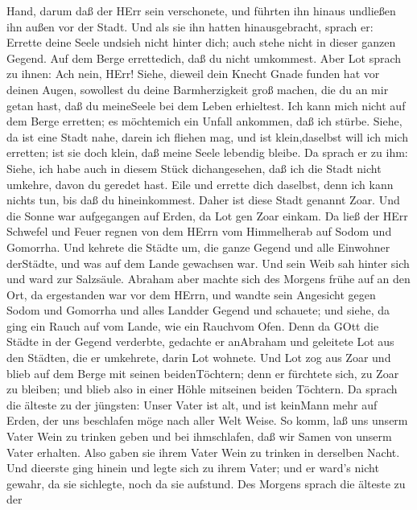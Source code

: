 Hand, darum daß der HErr sein verschonete, und führten ihn hinaus
undließen ihn außen vor der Stadt.  Und als sie ihn hatten
hinausgebracht, sprach er: Errette deine Seele undsieh nicht hinter
dich; auch stehe nicht in dieser ganzen Gegend. Auf dem Berge
errettedich, daß du nicht umkommest.  Aber Lot sprach zu
ihnen: Ach nein, HErr!  Siehe, dieweil dein Knecht Gnade
funden hat vor deinen Augen, sowollest du deine Barmherzigkeit groß
machen, die du an mir getan hast, daß du meineSeele bei dem Leben
erhieltest. Ich kann mich nicht auf dem Berge erretten; es möchtemich
ein Unfall ankommen, daß ich stürbe.  Siehe, da ist eine
Stadt nahe, darein ich fliehen mag, und ist klein,daselbst will ich mich
erretten; ist sie doch klein, daß meine Seele lebendig bleibe.
 Da sprach er zu ihm: Siehe, ich habe auch in diesem Stück
dichangesehen, daß ich die Stadt nicht umkehre, davon du geredet hast.
 Eile und errette dich daselbst, denn ich kann nichts tun,
bis daß du hineinkommest. Daher ist diese Stadt genannt Zoar.
 Und die Sonne war aufgegangen auf Erden, da Lot gen Zoar
einkam.  Da ließ der HErr Schwefel und Feuer regnen von dem
HErrn vom Himmelherab auf Sodom und Gomorrha.  Und kehrete
die Städte um, die ganze Gegend und alle Einwohner derStädte, und was
auf dem Lande gewachsen war.  Und sein Weib sah hinter sich
und ward zur Salzsäule.  Abraham aber machte sich des
Morgens frühe auf an den Ort, da ergestanden war vor dem HErrn,
 und wandte sein Angesicht gegen Sodom und Gomorrha und
alles Landder Gegend und schauete; und siehe, da ging ein Rauch auf vom
Lande, wie ein Rauchvom Ofen.  Denn da GOtt die Städte in
der Gegend verderbte, gedachte er anAbraham und geleitete Lot aus den
Städten, die er umkehrete, darin Lot wohnete.  Und Lot zog
aus Zoar und blieb auf dem Berge mit seinen beidenTöchtern; denn er
fürchtete sich, zu Zoar zu bleiben; und blieb also in einer Höhle
mitseinen beiden Töchtern.  Da sprach die älteste zu der
jüngsten: Unser Vater ist alt, und ist keinMann mehr auf Erden, der uns
beschlafen möge nach aller Welt Weise.  So komm, laß uns
unserm Vater Wein zu trinken geben und bei ihmschlafen, daß wir Samen
von unserm Vater erhalten.  Also gaben sie ihrem Vater Wein
zu trinken in derselben Nacht. Und dieerste ging hinein und legte sich
zu ihrem Vater; und er ward's nicht gewahr, da sie sichlegte, noch da
sie aufstund.  Des Morgens sprach die älteste zu der
